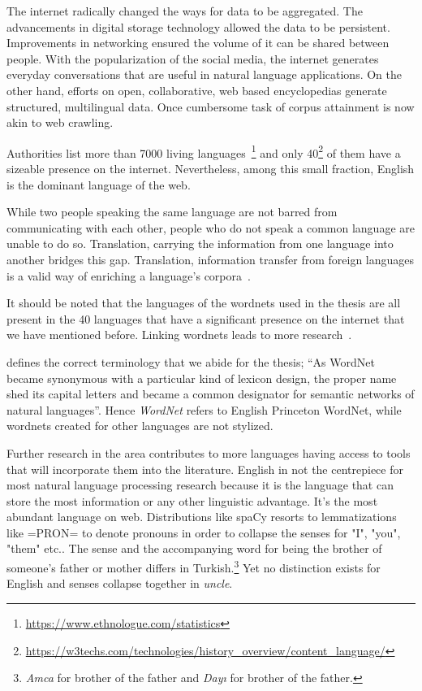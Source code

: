 The internet radically changed the ways for data to be aggregated.
The advancements in digital storage technology allowed the data to be persistent.
Improvements in networking ensured the volume of it can be shared between people.
With the popularization of the social media, the internet generates everyday conversations that are useful in natural language applications.
On the other hand, efforts on open, collaborative, web based encyclopedias generate structured, multilingual data.
Once cumbersome task of corpus attainment is now akin to web crawling.

Authorities list more than 7000 living languages~\footnote{\url{https://www.ethnologue.com/statistics}} and only 40\footnote{\url{https://w3techs.com/technologies/history_overview/content_language/}} of them have a sizeable presence on the internet.
Nevertheless, among this small fraction, English is the dominant language of the web.

While two people speaking the same language are not barred from communicating with each other, people who do not speak a common language are unable to do so.
Translation, carrying the information from one language into another bridges this gap.
Translation, information transfer from foreign languages is a valid way of enriching a language's corpora~\cite{ibrahim_usta_turkce_2006}.

It should be noted that the languages of the wordnets used in the thesis are all present in the 40 languages that have a significant presence on the internet that we have mentioned before.
Linking wordnets leads to more research~\cite{sagot_building_2008}.

\textcite{fellbaum_semantic_1998} defines the correct terminology that we abide for the thesis; \enquote{As WordNet became synonymous with a particular kind of lexicon design, the proper name shed its capital letters and became a common designator for semantic networks of natural languages}.
Hence \emph{WordNet} refers to English Princeton WordNet, while wordnets created for other languages are not stylized.

Further research in the area contributes to more languages having access to tools that will incorporate them into the literature.
English in not the centrepiece for most natural language processing research because it is the language that can store the most information or any other linguistic advantage.
It's the most abundant language on web.
Distributions like spaCy resorts to lemmatizations like =PRON= to denote pronouns in order to collapse the senses for "I", "you", "them" etc.\@.
The sense and the accompanying word for being the brother of someone's father or mother differs in Turkish.\footnote{\emph{Amca} for brother of the father and \emph{Dayı} for brother of the father.}
Yet no distinction exists for English and senses collapse together in \emph{uncle}.

